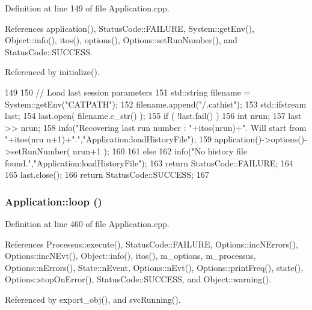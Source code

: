 Definition at line 149 of file Application.cpp.

References application(), StatusCode::FAILURE, System::getEnv(), Object::info(), itos(), options(), Options::setRunNumber(), and StatusCode::SUCCESS.

Referenced by initialize().


\begin{DoxyCode}
149                                        {
150   // Load last session parameters
151   std::string filename = System::getEnv("CATPATH");
152   filename.append("/.cathist");
153   std::ifstream last;
154   last.open( filename.c_str() );
155   if ( !last.fail() ) {
156     int nrun;
157     last >> nrun;
158     info("Recovering last run number : "+itos(nrun)+". Will start from "+itos(nru
      n+1)+".","Application:loadHistoryFile");
159     application()->options()->setRunNumber( nrun+1 );
160   }
161   else {
162     info("No history file found.","Application:loadHistoryFile");
163     return StatusCode::FAILURE;
164   }
165   last.close();
166   return StatusCode::SUCCESS;
167 }
\end{DoxyCode}
\hypertarget{classApplication_ab38055646202ef49c9ee2eda6d48076f}{
\subsubsection[{loop}]{ Application::loop ()}}
\label{classApplication_ab38055646202ef49c9ee2eda6d48076f}


Definition at line 460 of file Application.cpp.

References Processus::execute(), StatusCode::FAILURE, Options::incNErrors(), Options::incNEvt(), Object::info(), itos(), m\_\-options, m\_\-processus, Options::nErrors(), State::nEvent, Options::nEvt(), Options::printFreq(), state(), Options::stopOnError(), StatusCode::SUCCESS, and Object::warning().

Referenced by export\_\-obj(), and svcRunning().


